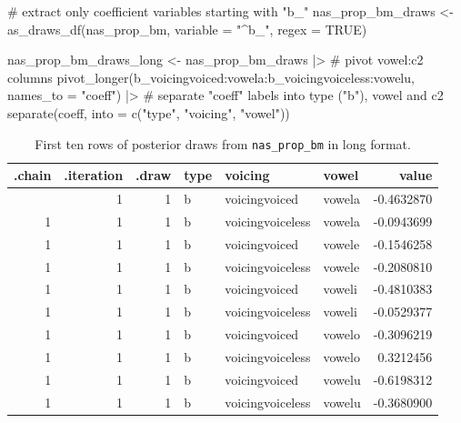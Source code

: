 \documentclass[
  authoryear,
  preprint,
  3p]{elsarticle}
\newenvironment{Shaded}{\begin{snugshade}}{\end{snugshade}}
\newcommand{\AttributeTok}[1]{\textcolor[rgb]{0.40,0.45,0.13}{#1}}
\newcommand{\CommentTok}[1]{\textcolor[rgb]{0.37,0.37,0.37}{#1}}
\newcommand{\ConstantTok}[1]{\textcolor[rgb]{0.56,0.35,0.01}{#1}}
\newcommand{\FunctionTok}[1]{\textcolor[rgb]{0.28,0.35,0.67}{#1}}
\newcommand{\NormalTok}[1]{\textcolor[rgb]{0.00,0.23,0.31}{#1}}
\newcommand{\OtherTok}[1]{\textcolor[rgb]{0.00,0.23,0.31}{#1}}
\newcommand{\SpecialCharTok}[1]{\textcolor[rgb]{0.37,0.37,0.37}{#1}}
\newcommand{\StringTok}[1]{\textcolor[rgb]{0.13,0.47,0.30}{#1}}
\begin{document}
\begin{Shaded}
\begin{Highlighting}[]
\CommentTok{\# extract only coefficient variables starting with "b\_"}
\NormalTok{nas\_prop\_bm\_draws }\OtherTok{\textless{}{-}} \FunctionTok{as\_draws\_df}\NormalTok{(nas\_prop\_bm, }\AttributeTok{variable =} \StringTok{"\^{}b\_"}\NormalTok{, }\AttributeTok{regex =} \ConstantTok{TRUE}\NormalTok{)}

\NormalTok{nas\_prop\_bm\_draws\_long }\OtherTok{\textless{}{-}}\NormalTok{ nas\_prop\_bm\_draws }\SpecialCharTok{|\textgreater{}} 
  \CommentTok{\# pivot vowel:c2 columns}
  \FunctionTok{pivot\_longer}\NormalTok{(}\StringTok{\textasciigrave{}}\AttributeTok{b\_voicingvoiced:vowela}\StringTok{\textasciigrave{}}\SpecialCharTok{:}\StringTok{\textasciigrave{}}\AttributeTok{b\_voicingvoiceless:vowelu}\StringTok{\textasciigrave{}}\NormalTok{, }\AttributeTok{names\_to =} \StringTok{"coeff"}\NormalTok{) }\SpecialCharTok{|\textgreater{}}
  \CommentTok{\# separate "coeff" labels into type ("b"), vowel and c2}
  \FunctionTok{separate}\NormalTok{(coeff, }\AttributeTok{into =} \FunctionTok{c}\NormalTok{(}\StringTok{"type"}\NormalTok{, }\StringTok{"voicing"}\NormalTok{, }\StringTok{"vowel"}\NormalTok{))}
\end{Highlighting}
\end{Shaded}

\begin{longtable}[]{@{}rrrlllr@{}}

\caption{\label{tbl-nas-draws}First ten rows of posterior draws from
\texttt{nas\_prop\_bm} in long format.}

\tabularnewline

\toprule\noalign{}
.chain & .iteration & .draw & type & voicing & vowel & value \\
\midrule\noalign{}
\endhead
\bottomrule\noalign{}
\endlastfoot
1 & 1 & 1 & b & voicingvoiced & vowela & -0.4632870 \\
1 & 1 & 1 & b & voicingvoiceless & vowela & -0.0943699 \\
1 & 1 & 1 & b & voicingvoiced & vowele & -0.1546258 \\
1 & 1 & 1 & b & voicingvoiceless & vowele & -0.2080810 \\
1 & 1 & 1 & b & voicingvoiced & voweli & -0.4810383 \\
1 & 1 & 1 & b & voicingvoiceless & voweli & -0.0529377 \\
1 & 1 & 1 & b & voicingvoiced & vowelo & -0.3096219 \\
1 & 1 & 1 & b & voicingvoiceless & vowelo & 0.3212456 \\
1 & 1 & 1 & b & voicingvoiced & vowelu & -0.6198312 \\
1 & 1 & 1 & b & voicingvoiceless & vowelu & -0.3680900 \\

\end{longtable}
\end{document}
